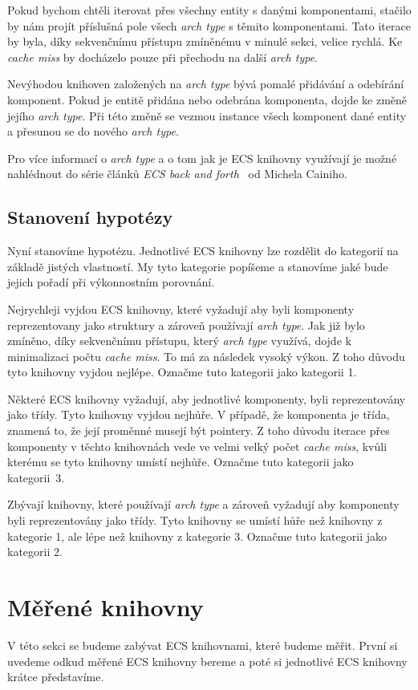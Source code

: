 Pokud bychom chtěli iterovat přes všechny entity s danými komponentami, stačilo by nám projít příslušná pole všech \textit{arch type} s těmito komponentami. Tato iterace by byla, díky sekvenčnímu přístupu zmíněnému v minulé sekci, velice rychlá. Ke \textit{cache miss} by docházelo pouze při přechodu na další \textit{arch type}.

Nevýhodou knihoven založených na \textit{arch type} bývá pomalé přidávání a odebírání komponent. Pokud je entitě přidána nebo odebrána komponenta, dojde ke změně jejího \textit{arch type}. Při této změně se vezmou instance všech komponent dané entity a přesunou se do nového \textit{arch type}.

Pro více informací o \textit{arch type} a o tom jak je ECS knihovny využívají je možné nahlédnout do série článků \textit{ECS back and forth}~\cite{Caini_2019} od Michela Cainiho.

\subsection{Stanovení hypotézy}
\label{hypothesis}
Nyní stanovíme hypotézu. Jednotlivé ECS knihovny lze rozdělit do kategorií na základě jistých vlastností. My tyto kategorie popíšeme a stanovíme jaké bude jejich pořadí při výkonnostním porovnání.

Nejrychleji vyjdou ECS knihovny, které vyžadují aby byli komponenty reprezentovany jako struktury a zároveň používají \textit{arch type}. Jak již bylo zmíněno, díky sekvenčnímu přístupu, který \textit{arch type} využívá, dojde k minimalizaci počtu \textit{cache miss}. To má za následek vysoký výkon. Z toho důvodu tyto knihovny vyjdou nejlépe. Označme tuto kategorii jako kategorii 1.

Některé ECS knihovny vyžadují, aby jednotlivé komponenty, byli reprezentovány jako třídy. Tyto knihovny vyjdou nejhůře. V případě, že komponenta je třída, znamená to, že její proměnné musejí být pointery. Z toho důvodu iterace přes komponenty v těchto knihovnách vede ve velmi velký počet \textit{cache miss}, kvůli kterému se tyto knihovny umístí nejhůře. Označme tuto kategorii jako kategorii~3.

Zbývají knihovny, které používají \textit{arch type} a zároveň vyžadují aby komponenty byli reprezentovány jako třídy. Tyto knihovny se umístí hůře než knihovny z kategorie 1, ale lépe než knihovny z kategorie 3. Označme tuto kategorii jako kategorii 2.

\section{Měřené knihovny}
V této sekci se budeme zabývat ECS knihovnami, které budeme měřit. První si uvedeme odkud měřené ECS knihovny bereme a poté si jednotlivé ECS knihovny krátce představíme.

